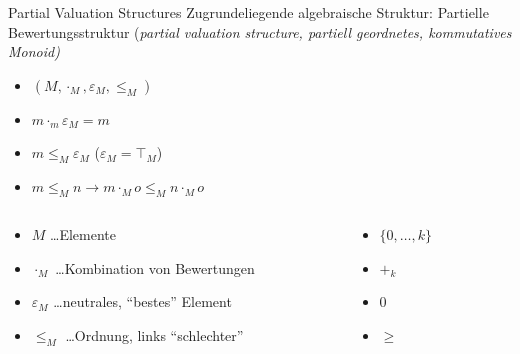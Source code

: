 \begin{frame}{Partial Valuation Structures}
Zugrundeliegende \alert{algebraische Struktur}: Partielle Bewertungsstruktur (\emph{partial valuation structure, partiell geordnetes, kommutatives Monoid)}
\begin{itemize}
\item $(M, \cdot_M, \varepsilon_M, \leq_M)$ 
\item $m \cdot_m \varepsilon_M = m$
\item $m \leq_M \varepsilon_M$ ($\varepsilon_M = \top_M$)
\item $m \leq_M n \rightarrow m \cdot_M o \leq_M n \cdot_M o$
\end{itemize}
\vspace*{2ex}

\begin{columns}[onlytextwidth,T]
    
    \begin{column}{.7\textwidth}
          
    
    \begin{itemize}
    \item $M$ \ldots Elemente
    \item $\cdot_M$ \ldots Kombination von Bewertungen
    \item $\varepsilon_M$ \ldots neutrales, ``bestes'' Element
    \item $\leq_M$ \ldots Ordnung, links ``schlechter''
    \end{itemize}
    \end{column}
    
    \begin{column}{.3\textwidth}
  	 \begin{itemize}
    \item $\{0, \ldots, k \}$ 
    \item $+_k$
    \item $0$ 
    \item $\geq$
    \end{itemize}
    \end{column}
  \end{columns}

  \vspace*{2ex}
  
  \hfill \emph{\cite{Gadducci2013,SchiendorferPvs2015}}
\end{frame}


